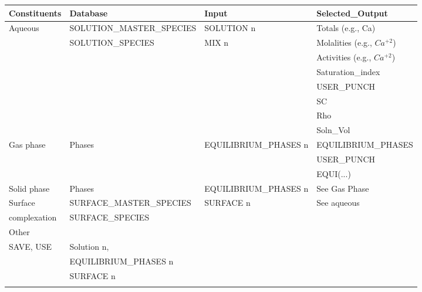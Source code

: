 \begin{table}[h]
\centering
\footnotesize
\begin{tabular}{llll}
\toprule
Constituents	& Database	                & Input	     & Selected\_Output   \\ \hline
Aqueous       &	SOLUTION\_MASTER\_SPECIES & SOLUTION n & Totals (e.g., Ca)   \\
              & SOLUTION\_SPECIES	        & MIX n      & Molalities (e.g., $Ca^{+2}$) \\
              &                           &            & Activities (e.g., $Ca^{+2}$) \\
              &                           &            & Saturation\_index  \\
              &                           &            & USER\_PUNCH       \\
              &                           &            &        SC         \\
              &                           &            &     Rho           \\
              &                           &            &   Soln\_Vol        \\ \hline
Gas phase	    & Phases	   & EQUILIBRIUM\_PHASES n   & EQUILIBRIUM\_PHASES \\
              &            &                         & USER\_PUNCH   \\
              &            &                         & EQUI(...)     \\ \hline
Solid phase	  & Phases     & EQUILIBRIUM\_PHASES n   & See Gas Phase \\ \hline
Surface       & SURFACE\_MASTER\_SPECIES & SURFACE n & See aqueous   \\
complexation  & SURFACE\_SPECIES         &           &       \\ \hline
Other         &                          &           &       \\ \hline
SAVE, USE	    & Solution n,              &           &       \\
              & EQUILIBRIUM\_PHASES n    &           &       \\ 
							& SURFACE n                &           &       \\ 
\bottomrule
\label{tab:keywords_mass_transfer}
\end{tabular}
\end{table}	


